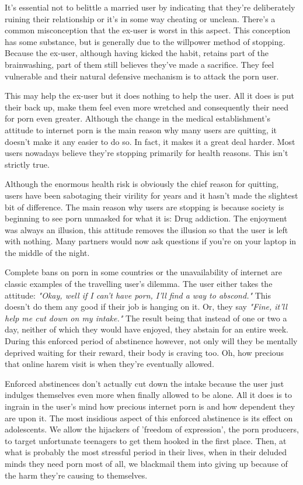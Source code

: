 \documentclass[easypeasy.tex]{subfiles}
\begin{document}
It's essential not to belittle a married user by indicating that they're deliberately ruining their relationship or it's in some way cheating or unclean. There's a common misconception that the ex-user is worst in this aspect. This conception has some substance, but is generally due to the willpower method of stopping. Because the ex-user, although having kicked the habit, retains part of the brainwashing, part of them still believes they've made a sacrifice. They feel vulnerable and their natural defensive mechanism is to attack the porn user.

This may help the ex-user but it does nothing to help the user. All it does is put their back up, make them feel even more wretched and consequently their need for porn even greater. Although the change in the medical establishment's attitude to internet porn is the main reason why many users are quitting, it doesn't make it any easier to do so. In fact, it makes it a great deal harder. Most users nowadays believe they're stopping primarily for health reasons. This isn't strictly true.

Although the enormous health risk is obviously the chief reason for quitting, users have been sabotaging their virility for years and it hasn't made the slightest bit of difference. The main reason why users are stopping is because society is beginning to see porn unmasked for what it is: Drug addiction. The enjoyment was always an illusion, this attitude removes the illusion so that the user is left with nothing. Many partners would now ask questions if you're on your laptop in the middle of the night.

Complete bans on porn in some countries or the unavailability of internet are classic examples of the travelling user's dilemma. The user either takes the attitude: \textit{"Okay, well if I can't have porn, I'll find a way to abscond."} This doesn't do them any good if their job is hanging on it. Or, they say \textit{"Fine, it'll help me cut down on my intake."} The result being that instead of one or two a day, neither of which they would have enjoyed, they abstain for an entire week. During this enforced period of abstinence however, not only will they be mentally deprived waiting for their reward, their body is craving too. Oh, how precious that online harem visit is when they're eventually allowed.

Enforced abstinences don't actually cut down the intake because the user just indulges themselves even more when finally allowed to be alone. All it does is to ingrain in the user's mind how precious internet porn is and how dependent they are upon it. The most insidious aspect of this enforced abstinence is its effect on adolescents. We allow the hijackers of 'freedom of expression', the porn producers, to target unfortunate teenagers to get them hooked in the first place. Then, at what is probably the most stressful period in their lives, when in their deluded minds they need porn most of all, we blackmail them into giving up because of the harm they're causing to themselves.
\end{document}
